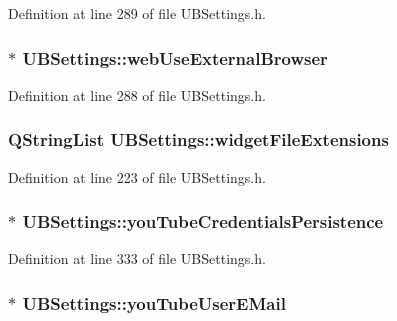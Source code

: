Definition at line 289 of file U\-B\-Settings.\-h.

\hypertarget{class_u_b_settings_adb8d7a0850fe577904e805075e4c3d19}{
\subsubsection[{web\-Use\-External\-Browser}]{$\ast$ U\-B\-Settings\-::web\-Use\-External\-Browser}}\label{db/d66/class_u_b_settings_adb8d7a0850fe577904e805075e4c3d19}


Definition at line 288 of file U\-B\-Settings.\-h.

\hypertarget{class_u_b_settings_a6b53dbd3edf2ae46368eb7d1545f6e73}{
\subsubsection[{widget\-File\-Extensions}]{\setlength{\rightskip}{0pt plus 5cm}Q\-String\-List U\-B\-Settings\-::widget\-File\-Extensions\hspace{0.3cm}{\ttfamily [static]}}}\label{db/d66/class_u_b_settings_a6b53dbd3edf2ae46368eb7d1545f6e73}


Definition at line 223 of file U\-B\-Settings.\-h.

\hypertarget{class_u_b_settings_ac1c11264ddacac37cbf0561f195f637b}{
\subsubsection[{you\-Tube\-Credentials\-Persistence}]{$\ast$ U\-B\-Settings\-::you\-Tube\-Credentials\-Persistence}}\label{db/d66/class_u_b_settings_ac1c11264ddacac37cbf0561f195f637b}


Definition at line 333 of file U\-B\-Settings.\-h.

\hypertarget{class_u_b_settings_a40322cccbd808bcdb2e088411f0e9b7b}{
\subsubsection[{you\-Tube\-User\-E\-Mail}]{$\ast$ U\-B\-Settings\-::you\-Tube\-User\-E\-Mail}}\label{db/d66/class_u_b_settings_a40322cccbd808bcdb2e088411f0e9b7b}



